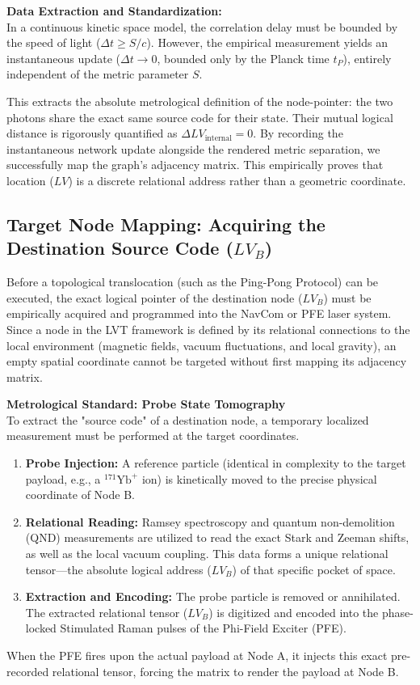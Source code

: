 \documentclass[12pt,a4paper]{article}
\begin{document}
\textbf{Data Extraction and Standardization:} \\
In a continuous kinetic space model, the correlation delay must be bounded by the speed of light ($\Delta t \ge S/c$). However, the empirical measurement yields an instantaneous update ($\Delta t \to 0$, bounded only by the Planck time $t_P$), entirely independent of the metric parameter $S$. 

This extracts the absolute metrological definition of the node-pointer: the two photons share the exact same source code for their state. Their mutual logical distance is rigorously quantified as $\Delta LV_{\mathrm{internal}} = 0$. By recording the instantaneous network update alongside the rendered metric separation, we successfully map the graph's adjacency matrix. This empirically proves that location ($LV$) is a discrete relational address rather than a geometric coordinate.

\subsection{Target Node Mapping: Acquiring the Destination Source Code ($LV_B$)}
Before a topological translocation (such as the Ping-Pong Protocol) can be executed, the exact logical pointer of the destination node ($LV_B$) must be empirically acquired and programmed into the NavCom or PFE laser system. Since a node in the LVT framework is defined by its relational connections to the local environment (magnetic fields, vacuum fluctuations, and local gravity), an empty spatial coordinate cannot be targeted without first mapping its adjacency matrix.

\textbf{Metrological Standard: Probe State Tomography} \\
To extract the "source code" of a destination node, a temporary localized measurement must be performed at the target coordinates.
\begin{enumerate}
    \item \textbf{Probe Injection:} A reference particle (identical in complexity to the target payload, e.g., a $^{171}\text{Yb}^+$ ion) is kinetically moved to the precise physical coordinate of Node B.
    \item \textbf{Relational Reading:} Ramsey spectroscopy and quantum non-demolition (QND) measurements are utilized to read the exact Stark and Zeeman shifts, as well as the local vacuum coupling. This data forms a unique relational tensor—the absolute logical address ($LV_B$) of that specific pocket of space.
    \item \textbf{Extraction and Encoding:} The probe particle is removed or annihilated. The extracted relational tensor ($LV_B$) is digitized and encoded into the phase-locked Stimulated Raman pulses of the Phi-Field Exciter (PFE). 
\end{enumerate}
When the PFE fires upon the actual payload at Node A, it injects this exact pre-recorded relational tensor, forcing the matrix to render the payload at Node B.
\end{document}
